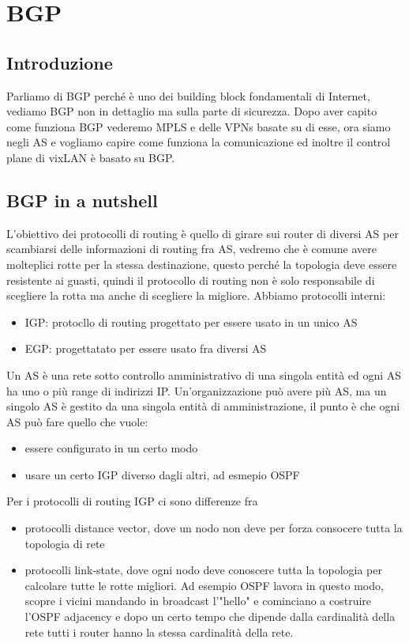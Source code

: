 \documentclass[12pt, oneside]{extbook} %
\begin{document}
\chapter{BGP}
\section{Introduzione}
Parliamo di BGP perché è uno dei building block fondamentali di Internet, vediamo BGP non in dettaglio ma sulla parte
di sicurezza. Dopo aver capito come funziona BGP vederemo MPLS e delle VPNs basate su di esse, ora siamo negli AS e vogliamo
capire come funziona la comunicazione ed inoltre il control plane di vixLAN è basato su BGP.
\section{BGP in a nutshell}
L'obiettivo dei protocolli di routing è quello di girare sui router di diversi AS per scambiarsi delle informazioni di routing
fra AS, vedremo che è comune avere molteplici rotte per la stessa destinazione, questo perché la topologia deve essere
resistente ai guasti, quindi il protocollo di routing non è solo responsabile di scegliere la rotta ma anche di scegliere
la migliore. Abbiamo protocolli interni:
\
\begin{itemize}
	\item IGP: protocllo di routing progettato per essere usato in un unico AS
	\item EGP: progettatato per essere usato fra diversi AS
\end{itemize}
Un AS è una rete sotto controllo amministrativo di una singola entità ed ogni AS ha uno o più range di indirizzi IP.
Un'organizzazione può avere più AS, ma un singolo AS è gestito da una singola entità di amministrazione, il punto è che
ogni AS può fare quello che vuole:
\begin{itemize}
	\item essere configurato in un certo modo
	\item usare un certo IGP diverso dagli altri, ad esmepio OSPF
\end{itemize}
Per i protocolli di routing IGP ci sono differenze fra
\begin{itemize}
	\item protocolli distance vector, dove un nodo non deve per forza consocere tutta la topologia di rete
	\item protocolli link-state, dove ogni nodo deve conoscere tutta la topologia per calcolare tutte le rotte migliori.
	Ad esempio OSPF lavora in questo modo, scopre i vicini mandando in broadcast l'"hello" e cominciano a costruire
	l'OSPF adjacency e dopo un certo tempo che dipende dalla cardinalità della rete tutti i router hanno la stessa cardinalità
	della rete.
\end{itemize}
\end{document}
